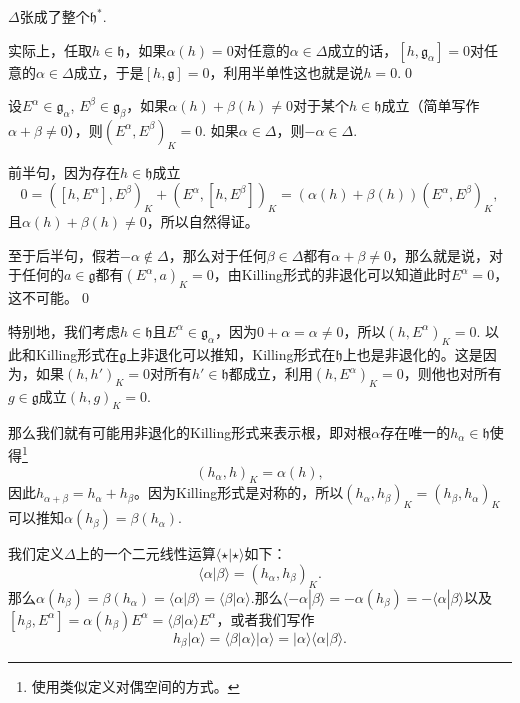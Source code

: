 \documentclass[9pt]{extarticle}
\newcommand{\lag}{{\mathfrak{g}}}
\begin{document}
\pro $\Delta$张成了整个$\mathfrak{h}^*$.

\proof 实际上，任取$h\in \mathfrak{h}$，如果$\alpha(h)=0$对任意的$\alpha\in \Delta$成立的话，$[h,\lag_{\alpha}]=0$对任意的$\alpha\in \Delta$成立，于是$[h,\lag]=0$，利用半单性这也就是说$h=0$.\qed

\pro 设$E^\alpha\in\lag_\alpha$, $E^\beta\in\lag_\beta$，如果$\alpha(h)+\beta(h)\neq 0$对于某个$h\in \mathfrak{h}$成立（简单写作$\alpha+\beta\neq 0$），则$(E^\alpha,E^\beta)_K=0$. 如果$\alpha\in\Delta$，则$-\alpha\in\Delta$.

\proof 前半句，因为存在$h\in\mathfrak{h}$成立
\[
	0=([h,E^\alpha],E^\beta)_K+(E^\alpha,[h,E^\beta])_K=(\alpha(h)+\beta(h))(E^\alpha,E^\beta)_K,
\]
且$\alpha(h)+\beta(h)\neq 0$，所以自然得证。

至于后半句，假若$-\alpha\notin\Delta$，那么对于任何$\beta\in\Delta$都有$\alpha+\beta\neq 0$，那么就是说，对于任何的$a\in \lag$都有$(E^\alpha,a)_K=0$，由Killing形式的非退化可以知道此时$E^\alpha=0$，这不可能。\qed


\para 特别地，我们考虑$h\in \mathfrak{h}$且$E^\alpha\in \lag_\alpha$，因为$0+\alpha=\alpha\neq 0$，所以$(h,E^\alpha)_K=0$. 以此和Killing形式在$\mathfrak{g}$上非退化可以推知，Killing形式在$\mathfrak{h}$上也是非退化的。这是因为，如果$(h,h')_K=0$对所有$h'\in \mathfrak{h}$都成立，利用$(h,E^\alpha)_K=0$，则他也对所有$g\in \lag$成立$(h,g)_K=0$.

那么我们就有可能用非退化的Killing形式来表示根，即对根$\alpha$存在唯一的$h_\alpha\in\mathfrak{h}$使得\footnote{使用类似定义对偶空间的方式。}
\[
	(h_\alpha,h)_K=\alpha(h),
\]
因此$h_{\alpha+\beta}=h_\alpha+h_\beta$。因为Killing形式是对称的，所以$(h_\alpha,h_\beta)_K=(h_\beta,h_\alpha)_K$可以推知$\alpha(h_\beta)=\beta(h_\alpha)$.

\para 我们定义$\Delta$上的一个二元线性运算$\langle \star|\star \rangle$如下：
\[
	\langle \alpha|\beta \rangle=(h_\alpha,h_\beta)_K.
\]
那么$\alpha(h_\beta)=\beta(h_\alpha)=\langle \alpha|\beta \rangle=\langle \beta|\alpha \rangle$.那么$\langle -\alpha|\beta \rangle=-\alpha(h_\beta)=-\langle \alpha|\beta \rangle$以及$[h_\beta,E^\alpha]=\alpha(h_\beta)E^\alpha=\langle \beta|\alpha \rangle E^\alpha$，或者我们写作
\[
	h_\beta|\alpha\rangle = \langle \beta|\alpha \rangle|\alpha\rangle=|\alpha\rangle \langle \alpha|\beta \rangle.
\]
\end{document}
